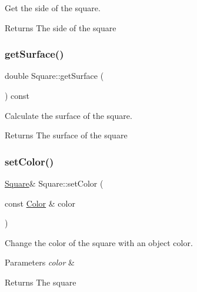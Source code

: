 Get the side of the square. 

\begin{DoxyReturn}{Returns}
The side of the square 
\end{DoxyReturn}
\mbox{\label{classSquare_a5d71637e24b4fb2438fc6281f969837f}} 
\subsubsection{\texorpdfstring{get\+Surface()}{getSurface()}}
{\footnotesize\ttfamily double Square\+::get\+Surface (\begin{DoxyParamCaption}{ }\end{DoxyParamCaption}) const}



Calculate the surface of the square. 

\begin{DoxyReturn}{Returns}
The surface of the square 
\end{DoxyReturn}
\mbox{\label{classSquare_a5d8f28334837fe3587016b98dcd7bd97}} 
\subsubsection{\texorpdfstring{set\+Color()}{setColor()}\hspace{0.1cm}{\footnotesize\ttfamily [1/2]}}
{\footnotesize\ttfamily \hyperlink{classSquare}{Square}\& Square\+::set\+Color (\begin{DoxyParamCaption}\item[{const \hyperlink{classColor}{Color} \&}]{color }\end{DoxyParamCaption})}



Change the color of the square with an object color. 


\begin{DoxyParams}{Parameters}
{\em color} & \\
\hline
\end{DoxyParams}
\begin{DoxyReturn}{Returns}
The square 
\end{DoxyReturn}
\mbox{\label{classSquare_af60aac95044ccbcb8ba7f079a79742de}} 
